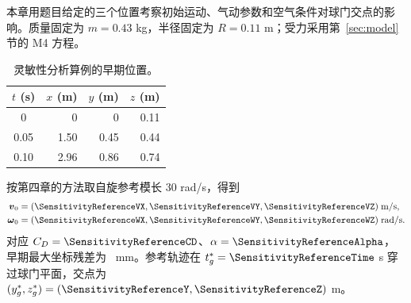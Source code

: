 本章用题目给定的三个位置考察初始运动、气动参数和空气条件对球门交点的影响。质量固定为 $m=0.43$ kg，半径固定为 $R=0.11$ m；受力采用第~\ref{sec:model} 节的 M4 方程。
\begin{table}[H]\centering\small
\caption{灵敏性分析算例的早期位置。}\label{tab:sensitivity-reference}
\begin{tabular}{crrr}\toprule
$t$ (s) & $x$ (m) & $y$ (m) & $z$ (m)\\\midrule
0 & 0 & 0 & 0.11\\
0.05 & 1.50 & 0.45 & 0.44\\
0.10 & 2.96 & 0.86 & 0.74\\\bottomrule
\end{tabular}\end{table}
按第四章的方法取自旋参考模长 30 rad/s，得到
\begin{equation}\begin{aligned}
\boldsymbol v_0&=(\SensitivityReferenceVX,\SensitivityReferenceVY,\SensitivityReferenceVZ)\;\mathrm{m/s},\\
\boldsymbol\omega_0&=(\SensitivityReferenceWX,\SensitivityReferenceWY,\SensitivityReferenceWZ)\;\mathrm{rad/s}.
\end{aligned}\label{eq:sensitivity-reference-state}\end{equation}
对应 $C_D=\SensitivityReferenceCD$、$\alpha=\SensitivityReferenceAlpha$，早期最大坐标残差为 \SensitivityReferenceResidual\ mm。参考轨迹在 $t_g^*=\SensitivityReferenceTime$ s 穿过球门平面，交点为 $(y_g^*,z_g^*)=(\SensitivityReferenceY,\SensitivityReferenceZ)$ m。

